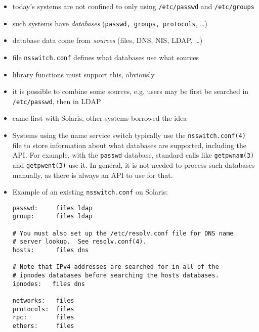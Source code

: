 \begin{slide}
\begin{itemize}
\item today's systems are not confined to only using
\texttt{/etc/passwd} and \texttt{/etc/groups}
\item such systems have \emph{databases} (\texttt{passwd, groups, protocols},
\dots)
\item database data come from \emph{sources} (files, DNS, NIS, LDAP, \dots)
\item file \texttt{nsswitch.conf} defines what databases use what sources
\item library functions must support this, obviously
\item it is possible to combine some sources, e.g. users may be first be searched
in \texttt{/etc/passwd}, then in LDAP
\item came first with Solaris, other systems borrowed the idea
\end{itemize}
\end{slide}


\begin{itemize}
\item Systems using the name service switch typically use the
\texttt{nsswitch.conf(4)} file to store information about what databases
are supported, including the API.  For example, with the \texttt{passwd}
database, standard calls like \texttt{getpwnam(3)} and \texttt{getpwent(3)} use
it.  In general, it is not needed to process such databases manually, as there is
always an API to use for that.
\item Example of an existing \texttt{nsswitch.conf} on Solaris:

\begin{verbatim}
passwd:     files ldap
group:      files ldap

# You must also set up the /etc/resolv.conf file for DNS name
# server lookup.  See resolv.conf(4).
hosts:      files dns

# Note that IPv4 addresses are searched for in all of the
# ipnodes databases before searching the hosts databases.
ipnodes:   files dns

networks:   files
protocols:  files
rpc:        files
ethers:     files
\end{verbatim}
\end{itemize}


